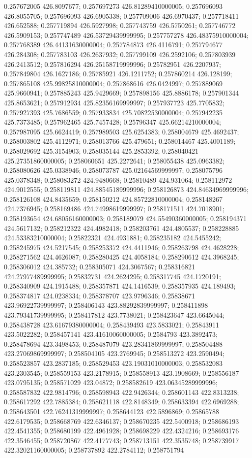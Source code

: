0.257672005 426.8097677; 0.257697273 426.81289410000005; 0.257696093 426.8055705; 0.257696093 426.6905338; 0.257709006 426.6970437; 0.257718411 426.652588; 0.257719894 426.5927998; 0.257743759 426.5750261; 0.257746772 426.5909153; 0.257747489 426.53729439999995; 0.257757278 426.48375910000004; 0.257768389 426.44131630000004; 0.257784873 426.4116791; 0.257794677 426.284308; 0.257783103 426.2637932; 0.257799109 426.2592106; 0.257803939 426.2413512; 0.257816294 426.25158719999996; 0.25782951 426.2207937; 0.257849804 426.1627186; 0.25785921 426.1211752; 0.257860214 426.128199; 0.257865108 425.99825810000004; 0.257868616 426.0424997; 0.257889069 425.9660941; 0.257885243 425.9429669; 0.257898156 425.8886178; 0.257901344 425.8653621; 0.257912934 425.82356169999997; 0.257937723 425.7705832; 0.257927393 425.7686559; 0.257933834 425.70822530000004; 0.257942235 425.7373485; 0.257962465 425.7457428; 0.25796347 425.66214210000004; 0.257987095 425.6624419; 0.257989503 425.6254383; 0.258004679 425.4692437; 0.258003802 425.4112971; 0.258013766 425.479651; 0.258014467 425.4001189; 0.258029692 425.3154903; 0.258035144 425.2853392; 0.258040421 425.27351860000005; 0.258060651 425.2272641; 0.258055438 425.0963382; 0.258080626 425.0338946; 0.258073787 425.02164569999997; 0.258075796 425.0378348; 0.258083272 424.9480668; 0.25810489 424.931064; 0.258112972 424.9012555; 0.258119811 424.88545189999996; 0.258126873 424.84634969999996; 0.258126108 424.8435659; 0.258150212 424.85722810000004; 0.258148267 424.7376945; 0.258169486 424.74998619999997; 0.258171511 424.7018901; 0.258193654 424.68056160000003; 0.258189079 424.55490360000005; 0.258194371 424.5617132; 0.258212322 424.4982418; 0.258203761 424.4805537; 0.258228885 424.53383210000004; 0.25822321 424.4931881; 0.258235182 424.5455242; 0.258245975 424.5217545; 0.258253372 424.4411946; 0.258263798 424.4628228; 0.258271562 424.4626087; 0.258280425 424.4058184; 0.258290612 424.3968245; 0.258306012 424.385732; 0.258305071 424.3067567; 0.258316821 424.27977489999995; 0.25832731 424.2624295; 0.258317745 424.1720191; 0.258340909 424.1915488; 0.258357871 424.1416539; 0.258357935 424.189493; 0.258374817 424.0238334; 0.258378707 423.9796346; 0.25838671 423.96922739999997; 0.258406143 423.88292839999997; 0.258411898 423.79341739999995; 0.258417812 423.7738021; 0.258423647 423.6645044; 0.258438728 423.61679380000004; 0.258439493 423.5833021; 0.25843911 423.5022282; 0.258457141 423.41610060000005; 0.2584793 423.3892473; 0.258478694 423.3498453; 0.258487079 423.28341869999997; 0.258504488 423.27069869999997; 0.258504105 423.2769945; 0.258513272 423.2590494; 0.258523857 423.2837185; 0.258529453 423.19031010000003; 0.258532083 423.2303545; 0.258559153 423.2178915; 0.258558913 423.1908669; 0.258556187 423.0795135; 0.258571029 423.04872; 0.258582619 423.06345289999996; 0.258587832 422.9814796; 0.258598943 422.9426344; 0.258601143 422.8313238; 0.258617292 422.7885384; 0.258621118 422.8148349; 0.258633394 422.6969288; 0.258643501 422.76241319999997; 0.258644123 422.5896869; 0.25865788 422.6179535; 0.258668769 422.6346137; 0.258670235 422.5400918; 0.258686193 422.4541355; 0.258680199 422.4961928; 0.258698229 422.4324216; 0.258693176 422.3546455; 0.258720867 422.4177743; 0.258713151 422.3535748; 0.258739917 422.32021160000005; 0.258737892 422.2784112; 0.258751794 
